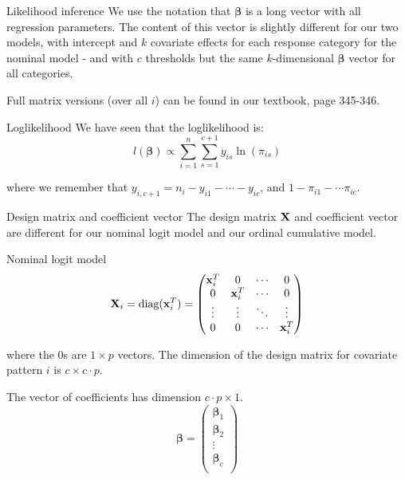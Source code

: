 \documentclass[
  ignorenonframetext,
]{beamer}
\begin{document}
\begin{frame}{Likelihood inference}
\protect\hypertarget{likelihood-inference}{}
We use the notation that \({\boldsymbol \beta}\) is a long vector with
all regression parameters. The content of this vector is slightly
different for our two models, with intercept and \(k\) covariate effects
for each response category for the nominal model - and with \(c\)
thresholds but the same \(k\)-dimensional \({\boldsymbol \beta}\) vector
for all categories.

Full matrix versions (over all \(i\)) can be found in our textbook, page
345-346.

\begin{block}{Loglikelihood}
\protect\hypertarget{loglikelihood-1}{}
We have seen that the loglikelihood is:
\[ l({\boldsymbol \beta})\propto\sum_{i=1}^n \sum_{s=1}^{c+1} y_{is}\ln(\pi_{is})\]

where we remember that \(y_{i,c+1}=n_i-y_{i1}-\cdots-y_{ic}\), and
\(1-\pi_{i1}-\cdots \pi_{ic}\).
\end{block}
\end{frame}

\begin{frame}
\begin{block}{Design matrix and coefficient vector}
\protect\hypertarget{design-matrix-and-coefficient-vector}{}
The design matrix \({\bf X}\) and coefficient vector are different for
our nominal logit model and our ordinal cumulative model.

\begin{block}{Nominal logit model}
\protect\hypertarget{nominal-logit-model}{}
\[{\bf X}_i=\text{diag}({\bf x}_i^T)=\begin{pmatrix}{\bf x}_i^T & 0 & \cdots & 0\\
0 & {\bf x}_i^T  & \cdots & 0\\
\vdots & \vdots & \ddots & \vdots\\
0 & 0 & \cdots & {\bf x}_i^T\\
\end{pmatrix}\]

where the \(0\)s are \(1\times p\) vectors. The dimension of the design
matrix for covariate pattern \(i\) is \(c \times c\cdot p\).
\end{block}
\end{block}
\end{frame}

\begin{frame}
The vector of coefficients has dimension \(c\cdot p \times 1\).
\[{\boldsymbol \beta}=\begin{pmatrix}{\boldsymbol \beta}_1\\{\boldsymbol \beta}_2\\\vdots\\{\boldsymbol \beta}_c\\ \end{pmatrix}\]
\end{frame}
\end{document}
